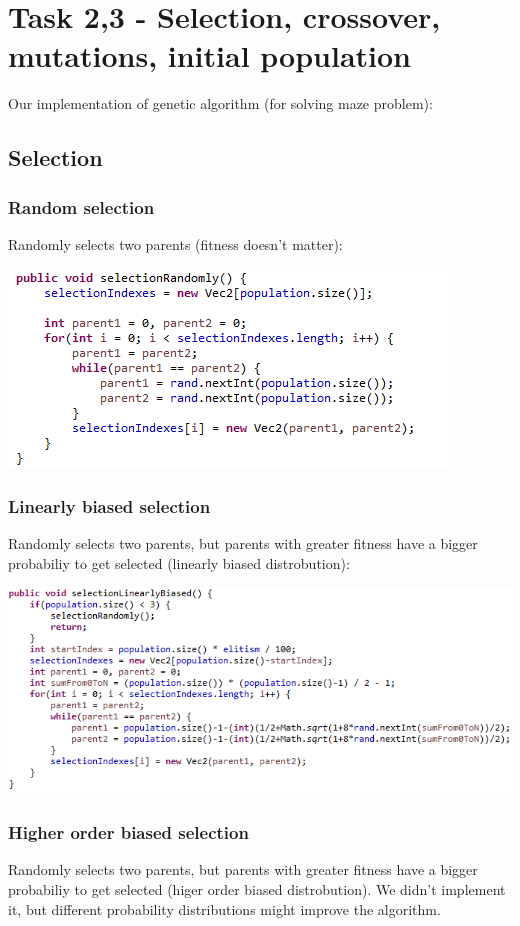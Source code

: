 \documentclass[12pt]{article} %
\begin{document}
\section{Task 2,3 - Selection, crossover, mutations, initial population}
Our implementation of genetic algorithm (for solving maze problem):

\subsection{Selection}
\subsubsection{Random selection}
Randomly selects two parents (fitness doesn't matter):

\includegraphics[scale=1]{randomSelection}

\subsubsection{Linearly biased selection}
Randomly selects two parents, but parents with greater fitness have a bigger probabiliy to get selected (linearly biased distrobution):

\includegraphics[scale=1]{linearSelection}


\subsubsection{Higher order biased selection}
Randomly selects two parents, but parents with greater fitness have a bigger probabiliy to get selected (higer order biased distrobution). We didn't implement it, but different probability distributions might improve the algorithm.
\end{document}
